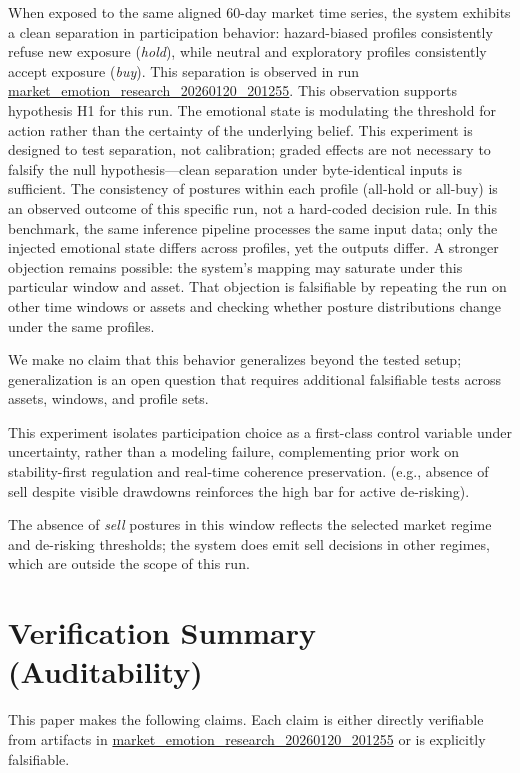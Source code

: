 \documentclass[12pt,a4paper]{report}
\begin{document}
When exposed to the same aligned 60-day market time series, the system exhibits a clean separation in participation behavior: hazard-biased profiles consistently refuse new exposure (\emph{hold}), while neutral and exploratory profiles consistently accept exposure (\emph{buy}). This separation is observed in run \href{https://github.com/jhcragin/SpiralBrain-v3.0-public/tree/main/market_emotion_risk_posture/results}{market_emotion_research_20260120_201255}. This observation supports hypothesis H1 for this run. The emotional state is modulating the threshold for action rather than the certainty of the underlying belief.
This experiment is designed to test separation, not calibration; graded effects are not necessary to falsify the null hypothesis—clean separation under byte-identical inputs is sufficient.
The consistency of postures within each profile (all-hold or all-buy) is an observed outcome of this specific run, not a hard-coded decision rule. In this benchmark, the same inference pipeline processes the same input data; only the injected emotional state differs across profiles, yet the outputs differ. A stronger objection remains possible: the system's mapping may saturate under this particular window and asset. That objection is falsifiable by repeating the run on other time windows or assets and checking whether posture distributions change under the same profiles.

We make no claim that this behavior generalizes beyond the tested setup; generalization is an open question that requires additional falsifiable tests across assets, windows, and profile sets.

This experiment isolates participation choice as a first-class control variable under uncertainty, rather than a modeling failure, complementing prior work on stability-first regulation and real-time coherence preservation. (e.g., absence of sell despite visible drawdowns reinforces the high bar for active de-risking).

The absence of \emph{sell} postures in this window reflects the selected market regime and de-risking thresholds; the system does emit sell decisions in other regimes, which are outside the scope of this run.

\section{Verification Summary (Auditability)}

This paper makes the following claims. Each claim is either directly verifiable from artifacts in \href{https://github.com/jhcragin/SpiralBrain-v3.0-public/tree/main/market_emotion_risk_posture/results}{market_emotion_research_20260120_201255} or is explicitly falsifiable.
\end{document}
